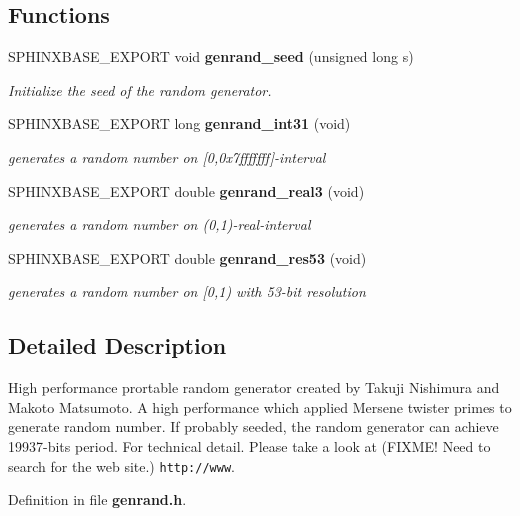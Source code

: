 \subsection*{\-Functions}
\begin{DoxyCompactItemize}
\item 
\-S\-P\-H\-I\-N\-X\-B\-A\-S\-E\-\_\-\-E\-X\-P\-O\-R\-T void {\bf genrand\-\_\-seed} (unsigned long s)\label{genrand_8h_a2881c7b606d9a2b2852e5946d71d32b7}

\begin{DoxyCompactList}\small\item\em \-Initialize the seed of the random generator. \end{DoxyCompactList}\item 
\-S\-P\-H\-I\-N\-X\-B\-A\-S\-E\-\_\-\-E\-X\-P\-O\-R\-T long {\bf genrand\-\_\-int31} (void)\label{genrand_8h_a10263695978c84103fb3526fdae21d4c}

\begin{DoxyCompactList}\small\item\em generates a random number on [0,0x7fffffff]-\/interval \end{DoxyCompactList}\item 
\-S\-P\-H\-I\-N\-X\-B\-A\-S\-E\-\_\-\-E\-X\-P\-O\-R\-T double {\bf genrand\-\_\-real3} (void)\label{genrand_8h_ad5fbfda1cb738d2beff277444bc71b1a}

\begin{DoxyCompactList}\small\item\em generates a random number on (0,1)-\/real-\/interval \end{DoxyCompactList}\item 
\-S\-P\-H\-I\-N\-X\-B\-A\-S\-E\-\_\-\-E\-X\-P\-O\-R\-T double {\bf genrand\-\_\-res53} (void)\label{genrand_8h_a2fca03c5dad1835f55e09c6e66d3b960}

\begin{DoxyCompactList}\small\item\em generates a random number on [0,1) with 53-\/bit resolution \end{DoxyCompactList}\end{DoxyCompactItemize}


\subsection{\-Detailed \-Description}
\-High performance prortable random generator created by \-Takuji \-Nishimura and \-Makoto \-Matsumoto. \-A high performance which applied \-Mersene twister primes to generate random number. \-If probably seeded, the random generator can achieve 19937-\/bits period. \-For technical detail. \-Please take a look at (\-F\-I\-X\-M\-E! \-Need to search for the web site.) {\tt http\-://www}. 

\-Definition in file {\bf genrand.\-h}.

